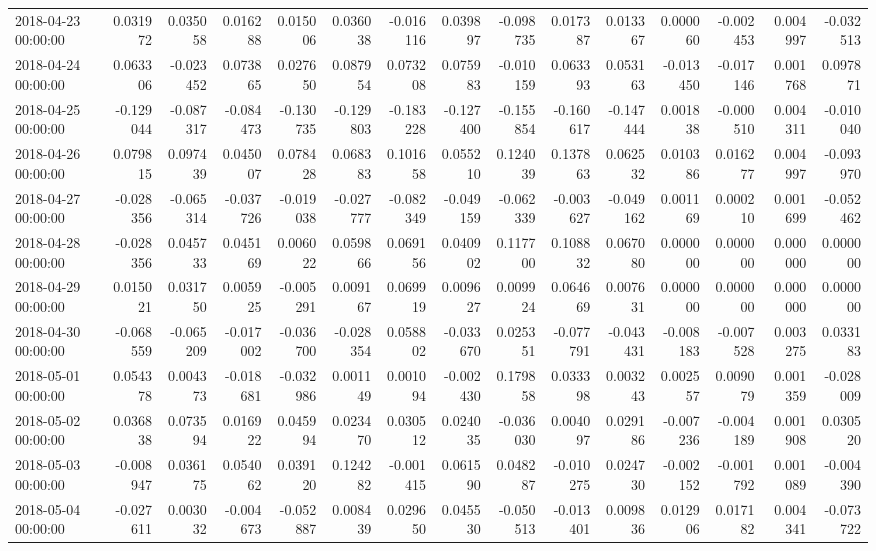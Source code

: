 \begin{tabular}{lrrrrrrrrrrrrrr}
2018-04-23 00:00:00 & 0.031972 & 0.035058 & 0.016288 & 0.015006 & 0.036038 & -0.016116 & 0.039897 & -0.098735 & 0.017387 & 0.013367 & 0.000060 & -0.002453 & 0.004997 & -0.032513 \\
2018-04-24 00:00:00 & 0.063306 & -0.023452 & 0.073865 & 0.027650 & 0.087954 & 0.073208 & 0.075983 & -0.010159 & 0.063393 & 0.053163 & -0.013450 & -0.017146 & 0.001768 & 0.097871 \\
2018-04-25 00:00:00 & -0.129044 & -0.087317 & -0.084473 & -0.130735 & -0.129803 & -0.183228 & -0.127400 & -0.155854 & -0.160617 & -0.147444 & 0.001838 & -0.000510 & 0.004311 & -0.010040 \\
2018-04-26 00:00:00 & 0.079815 & 0.097439 & 0.045007 & 0.078428 & 0.068383 & 0.101658 & 0.055210 & 0.124039 & 0.137863 & 0.062532 & 0.010386 & 0.016277 & 0.004997 & -0.093970 \\
2018-04-27 00:00:00 & -0.028356 & -0.065314 & -0.037726 & -0.019038 & -0.027777 & -0.082349 & -0.049159 & -0.062339 & -0.003627 & -0.049162 & 0.001169 & 0.000210 & 0.001699 & -0.052462 \\
2018-04-28 00:00:00 & -0.028356 & 0.045733 & 0.045169 & 0.006022 & 0.059866 & 0.069156 & 0.040902 & 0.117700 & 0.108832 & 0.067080 & 0.000000 & 0.000000 & 0.000000 & 0.000000 \\
2018-04-29 00:00:00 & 0.015021 & 0.031750 & 0.005925 & -0.005291 & 0.009167 & 0.069919 & 0.009627 & 0.009924 & 0.064669 & 0.007631 & 0.000000 & 0.000000 & 0.000000 & 0.000000 \\
2018-04-30 00:00:00 & -0.068559 & -0.065209 & -0.017002 & -0.036700 & -0.028354 & 0.058802 & -0.033670 & 0.025351 & -0.077791 & -0.043431 & -0.008183 & -0.007528 & 0.003275 & 0.033183 \\
2018-05-01 00:00:00 & 0.054378 & 0.004373 & -0.018681 & -0.032986 & 0.001149 & 0.001094 & -0.002430 & 0.179858 & 0.033398 & 0.003243 & 0.002557 & 0.009079 & 0.001359 & -0.028009 \\
2018-05-02 00:00:00 & 0.036838 & 0.073594 & 0.016922 & 0.045994 & 0.023470 & 0.030512 & 0.024035 & -0.036030 & 0.004097 & 0.029186 & -0.007236 & -0.004189 & 0.001908 & 0.030520 \\
2018-05-03 00:00:00 & -0.008947 & 0.036175 & 0.054062 & 0.039120 & 0.124282 & -0.001415 & 0.061590 & 0.048287 & -0.010275 & 0.024730 & -0.002152 & -0.001792 & 0.001089 & -0.004390 \\
2018-05-04 00:00:00 & -0.027611 & 0.003032 & -0.004673 & -0.052887 & 0.008439 & 0.029650 & 0.045530 & -0.050513 & -0.013401 & 0.009836 & 0.012906 & 0.017182 & 0.004341 & -0.073722 \\

\end{tabular}
